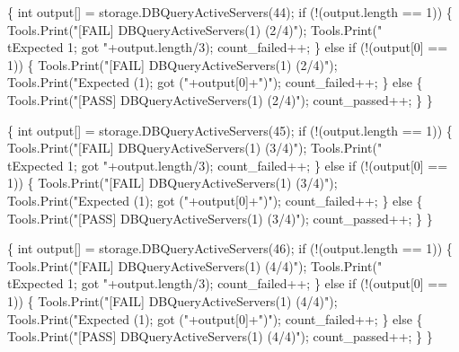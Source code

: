 \documentclass{article}
\def\nwendcode{\endtrivlist \endgroup}
\let\nwdocspar=\par
\begin{document}
\{
  int output[] = storage.DBQueryActiveServers(44);
  if (!(output.length == 1)) \{
    Tools.Print("[FAIL] DBQueryActiveServers(1) (2/4)");
    Tools.Print("\\tExpected 1; got "+output.length/3);
    count_failed++;
  \} else if (!(output[0] == 1)) \{
    Tools.Print("[FAIL] DBQueryActiveServers(1) (2/4)");
    Tools.Print("Expected (1); got ("+output[0]+")");
    count_failed++;
  \} else \{
    Tools.Print("[PASS] DBQueryActiveServers(1) (2/4)");
    count_passed++;
  \}
\}
\nwendcode{}\nwdocspar
\nwenddocs{}\endmoddef{}
\{
  int output[] = storage.DBQueryActiveServers(45);
  if (!(output.length == 1)) \{
    Tools.Print("[FAIL] DBQueryActiveServers(1) (3/4)");
    Tools.Print("\\tExpected 1; got "+output.length/3);
    count_failed++;
  \} else if (!(output[0] == 1)) \{
    Tools.Print("[FAIL] DBQueryActiveServers(1) (3/4)");
    Tools.Print("Expected (1); got ("+output[0]+")");
    count_failed++;
  \} else \{
    Tools.Print("[PASS] DBQueryActiveServers(1) (3/4)");
    count_passed++;
  \}
\}
\nwendcode{}\nwdocspar
\nwenddocs{}\endmoddef{}
\{
  int output[] = storage.DBQueryActiveServers(46);
  if (!(output.length == 1)) \{
    Tools.Print("[FAIL] DBQueryActiveServers(1) (4/4)");
    Tools.Print("\\tExpected 1; got "+output.length/3);
    count_failed++;
  \} else if (!(output[0] == 1)) \{
    Tools.Print("[FAIL] DBQueryActiveServers(1) (4/4)");
    Tools.Print("Expected (1); got ("+output[0]+")");
    count_failed++;
  \} else \{
    Tools.Print("[PASS] DBQueryActiveServers(1) (4/4)");
    count_passed++;
  \}
\}
\nwendcode{}\nwdocspar
\end{document}
